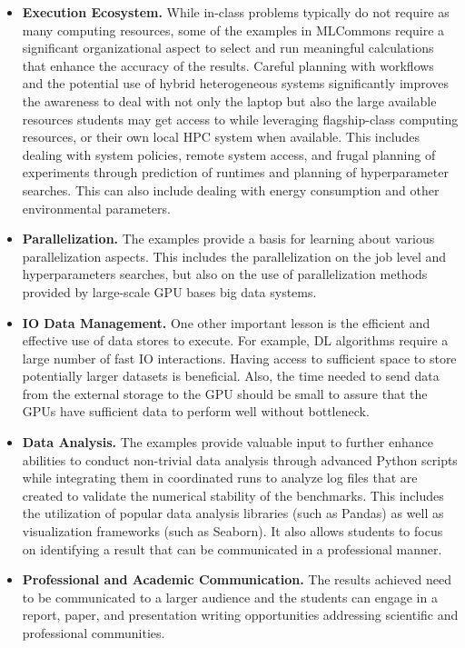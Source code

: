 \documentclass[utf8]{FrontiersinVancouver} %
\begin{document}
\begin{itemize}
\item {\bf Execution Ecosystem.} While in-class problems typically do
  not require as many computing resources, some of the examples in
  MLCommons require a significant organizational aspect to select and
  run meaningful calculations that enhance the accuracy of the
  results. Careful planning with workflows and the potential use of
  hybrid heterogeneous systems significantly improves the awareness to
  deal with not only the laptop but also the large available resources
  students may get access to while leveraging flagship-class computing
  resources, or their own local HPC system when available. This
  includes dealing with system policies, remote system access, and
  frugal planning of experiments through prediction of runtimes and
  planning of hyperparameter searches. This can also include dealing
  with energy consumption and other environmental parameters.

\item {\bf Parallelization.} The examples provide a basis for learning
  about various parallelization aspects. This includes the
  parallelization on the job level and hyperparameters searches, but
  also on the use of parallelization methods provided by large-scale
  GPU bases big data systems.

\item {\bf IO Data Management.} One other important lesson is the
  efficient and effective use of data stores to execute.  For example,
  DL algorithms require a large number of fast IO interactions.
  Having access to sufficient space to store potentially larger
  datasets is beneficial. Also, the time needed to send data from the
  external storage to the GPU should be small to assure that the GPUs
  have sufficient data to perform well without bottleneck.

\item {\bf Data Analysis.} The examples provide valuable input to
  further enhance abilities to conduct non-trivial data analysis
  through advanced Python scripts while integrating them in
  coordinated runs to analyze log files that are created to validate
  the numerical stability of the benchmarks. This includes the
  utilization of popular data analysis libraries (such as Pandas) as
  well as visualization frameworks (such as Seaborn). It also allows
  students to focus on identifying a result that can be communicated
  in a professional manner.

\item {\bf Professional and Academic Communication.} The results
  achieved need to be communicated to a larger audience and the
  students can engage in a report, paper, and presentation writing
  opportunities addressing scientific and professional communities.


\end{itemize}
\end{document}
